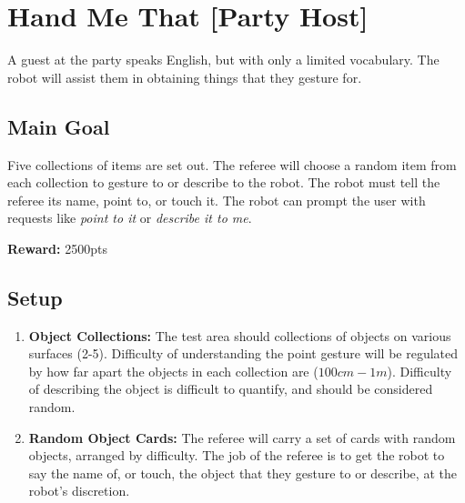 \section{Hand Me That [Party Host]}
A guest at the party speaks English, but with only a limited vocabulary. The robot will assist them in obtaining things that they gesture for.


\subsection{Main Goal}
Five collections of items are set out. The referee will choose a random item from each collection to gesture to or describe to the robot. The robot must tell the referee its name, point to, or touch it. The robot can prompt the user with requests like \textit{point to it} or \textit{describe it to me}.

\noindent\textbf{Reward:} 2500pts\\


%
%
\subsection{Setup}
\begin{enumerate}
	\item \textbf{Object Collections:} The test area should collections of objects on various surfaces (2-5). Difficulty of understanding the point gesture will be regulated by how far apart the objects in each collection are ($100cm - 1m$). Difficulty of describing the object is difficult to quantify, and should be considered random.

	\item \textbf{Random Object Cards:} The referee will carry a set of cards with random objects, arranged by difficulty. The job of the referee is to get the robot to say the name of, or touch, the object that they gesture to or describe, at the robot's discretion.

\end{enumerate}


